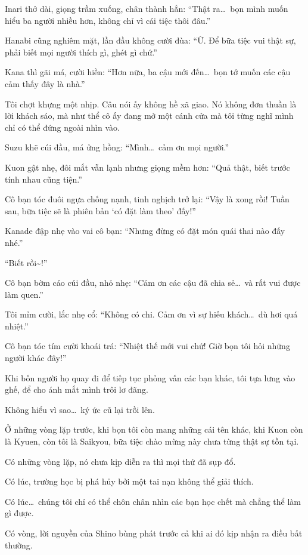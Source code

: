 \documentclass[../main.tex]{subfiles}
\begin{document}
Inari thở dài, giọng trầm xuống, chân thành hẳn: ``Thật ra\dots\ bọn mình muốn hiểu ba người nhiều hơn, không chỉ vì cái tiệc thôi đâu.''

Hanabi cũng nghiêm mặt, lần đầu không cười đùa: ``Ừ. Để bữa tiệc vui thật sự, phải biết mọi người thích gì, ghét gì chứ.''

Kana thì gãi má, cười hiền: ``Hơn nữa, ba cậu mới đến\dots\ bọn tớ muốn các cậu cảm thấy đây là nhà.''

Tôi chợt khựng một nhịp. Câu nói ấy không hề xã giao. Nó không đơn thuần là lời khách sáo, mà như thể cô ấy đang mở một cánh cửa mà tôi từng nghĩ mình chỉ có thể đứng ngoài nhìn vào.

Suzu khẽ cúi đầu, má ửng hồng: ``Mình\dots\ cảm ơn mọi người.''

Kuon gật nhẹ, đôi mắt vẫn lạnh nhưng giọng mềm hơn: ``Quả thật, biết trước tính nhau cũng tiện.''

Cô bạn tóc đuôi ngựa chống nạnh, tinh nghịch trở lại: ``Vậy là xong rồi! Tuần sau, bữa tiệc sẽ là phiên bản `có đặt làm theo' đấy!''

Kanade đập nhẹ vào vai cô bạn: ``Nhưng đừng có đặt món quái thai nào đấy nhé.''

``Biết rồi\~{}!''

Cô bạn bờm cáo cúi đầu, nhỏ nhẹ: ``Cảm ơn các cậu đã chia sẻ\dots\ và rất vui được làm quen.''

Tôi mỉm cười, lắc nhẹ cổ: ``Không có chi. Cảm ơn vì sự hiếu khách\dots\ dù hơi quá nhiệt.''

Cô bạn tóc tím cười khoái trá: ``Nhiệt thế mới vui chứ! Giờ bọn tôi hỏi những người khác đây!''

\il

Khi bốn người họ quay đi để tiếp tục phỏng vấn các bạn khác, tôi tựa lưng vào ghế, để cho ánh mắt mình trôi lơ đãng.

Không hiểu vì sao\dots\ ký ức cũ lại trồi lên.

Ở những vòng lặp trước, khi bọn tôi còn mang những cái tên khác, khi Kuon còn là Kyuen, còn tôi là Saikyou, bữa tiệc chào mừng này chưa từng thật sự tồn tại.

Có những vòng lặp, nó chưa kịp diễn ra thì mọi thứ đã sụp đổ.

Có lúc, trường học bị phá hủy bởi một tai nạn không thể giải thích.

Có lúc\dots\ chúng tôi chỉ có thể chôn chân nhìn các bạn học chết mà chẳng thể làm gì được.

Có vòng, lời nguyền của Shino bùng phát trước cả khi ai đó kịp nhận ra điều bất thường.
\end{document}
